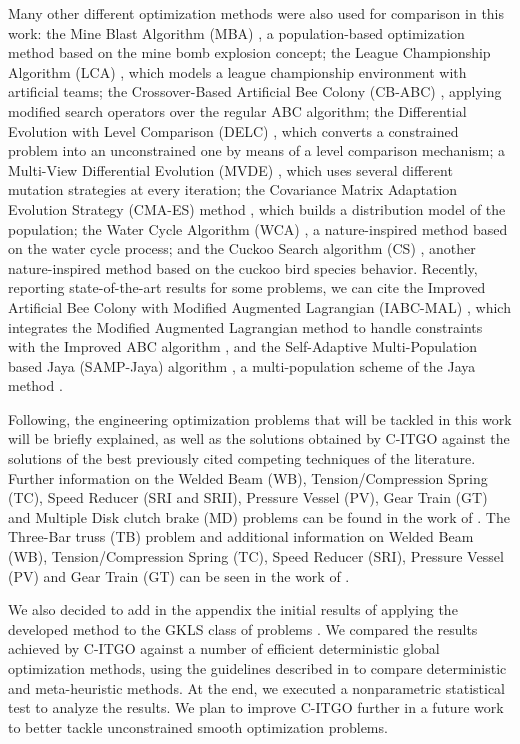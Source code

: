 Many other different optimization methods were also used for comparison in this work: the Mine Blast Algorithm (MBA) \citep{MBA}, a population-based optimization method based on the mine bomb explosion concept; the League Championship Algorithm (LCA) \citep{LCA}, which models a league championship environment with artificial teams; the Crossover-Based Artificial Bee Colony (CB-ABC) \citep{CB-ABC}, applying modified search operators over the regular ABC algorithm; the Differential Evolution with Level Comparison (DELC) \citep{DELC}, which converts a constrained problem into an unconstrained one by means of a level comparison mechanism; a Multi-View Differential Evolution (MVDE) \citep{MVDE}, which uses several different mutation strategies at every iteration; the Covariance Matrix Adaptation Evolution Strategy (CMA-ES) method \citep{CMA-ES}, which builds a distribution model of the population; the Water Cycle Algorithm (WCA) \citep{WCA}, a nature-inspired method based on the water cycle process; and the Cuckoo Search algorithm (CS) \citep{CS}, another nature-inspired method based on the cuckoo bird species behavior. Recently, reporting state-of-the-art results for some problems, we can cite the Improved Artificial Bee Colony with Modified Augmented Lagrangian (IABC-MAL) \citep{IABC-Mal}, which integrates the Modified Augmented Lagrangian method to handle constraints with the Improved ABC algorithm \citep{IABC}, and the Self-Adaptive Multi-Population based Jaya (SAMP-Jaya) algorithm \citep{SAMP-Jaya}, a multi-population scheme of the Jaya method \citep{Jaya}.


Following, the engineering optimization problems that will be tackled in this work will be briefly explained, as well as the solutions obtained by C-ITGO against the solutions of the best previously cited competing techniques of the literature. Further information on the Welded Beam (WB), Tension/Compression Spring (TC), Speed Reducer (SRI and SRII), Pressure Vessel (PV), Gear Train (GT) and Multiple Disk clutch brake (MD) problems can be found in the work of \cite{IAPSO}. The Three-Bar truss (TB) problem and additional information on Welded Beam (WB), Tension/Compression Spring (TC), Speed Reducer (SRI), Pressure Vessel (PV) and Gear Train (GT) can be seen in the work of \cite{MBA}.


We also decided to add in the appendix the initial results of applying the developed method to the GKLS class of problems \citep{GKLS}. We compared the results achieved by C-ITGO against a number of efficient deterministic global optimization methods, using the guidelines described in \cite{NAT} to compare deterministic and meta-heuristic methods. At the end, we executed a nonparametric statistical test to analyze the results. We plan to improve C-ITGO further in a future work to better tackle unconstrained smooth optimization problems.



